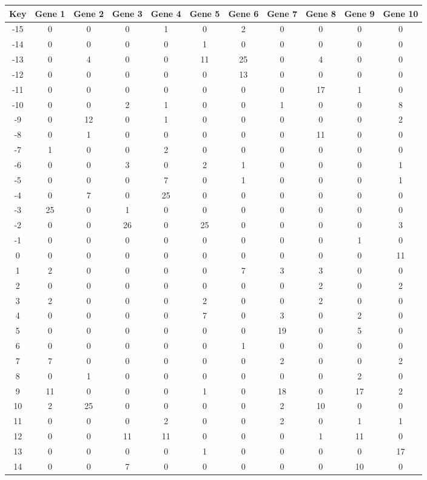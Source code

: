 \begin{tabular}{|c|c|c|c|c|c|c|c|c|c|c|}
\hline
Key & Gene 1 & Gene 2 & Gene 3 & Gene 4 & Gene 5 & Gene 6 & Gene 7 & Gene 8 & Gene 9 & Gene 10 \\
\hline
-15 & 0 & 0 & 0 & 1 & 0 & 2 & 0 & 0 & 0 & 0 \\
-14 & 0 & 0 & 0 & 0 & 1 & 0 & 0 & 0 & 0 & 0 \\
-13 & 0 & 4 & 0 & 0 & 11 & 25 & 0 & 4 & 0 & 0 \\
-12 & 0 & 0 & 0 & 0 & 0 & 13 & 0 & 0 & 0 & 0 \\
-11 & 0 & 0 & 0 & 0 & 0 & 0 & 0 & 17 & 1 & 0 \\
-10 & 0 & 0 & 2 & 1 & 0 & 0 & 1 & 0 & 0 & 8 \\
-9 & 0 & 12 & 0 & 1 & 0 & 0 & 0 & 0 & 0 & 2 \\
-8 & 0 & 1 & 0 & 0 & 0 & 0 & 0 & 11 & 0 & 0 \\
-7 & 1 & 0 & 0 & 2 & 0 & 0 & 0 & 0 & 0 & 0 \\
-6 & 0 & 0 & 3 & 0 & 2 & 1 & 0 & 0 & 0 & 1 \\
-5 & 0 & 0 & 0 & 7 & 0 & 1 & 0 & 0 & 0 & 1 \\
-4 & 0 & 7 & 0 & 25 & 0 & 0 & 0 & 0 & 0 & 0 \\
-3 & 25 & 0 & 1 & 0 & 0 & 0 & 0 & 0 & 0 & 0 \\
-2 & 0 & 0 & 26 & 0 & 25 & 0 & 0 & 0 & 0 & 3 \\
-1 & 0 & 0 & 0 & 0 & 0 & 0 & 0 & 0 & 1 & 0 \\
0 & 0 & 0 & 0 & 0 & 0 & 0 & 0 & 0 & 0 & 11 \\
1 & 2 & 0 & 0 & 0 & 0 & 7 & 3 & 3 & 0 & 0 \\
2 & 0 & 0 & 0 & 0 & 0 & 0 & 0 & 2 & 0 & 2 \\
3 & 2 & 0 & 0 & 0 & 2 & 0 & 0 & 2 & 0 & 0 \\
4 & 0 & 0 & 0 & 0 & 7 & 0 & 3 & 0 & 2 & 0 \\
5 & 0 & 0 & 0 & 0 & 0 & 0 & 19 & 0 & 5 & 0 \\
6 & 0 & 0 & 0 & 0 & 0 & 1 & 0 & 0 & 0 & 0 \\
7 & 7 & 0 & 0 & 0 & 0 & 0 & 2 & 0 & 0 & 2 \\
8 & 0 & 1 & 0 & 0 & 0 & 0 & 0 & 0 & 2 & 0 \\
9 & 11 & 0 & 0 & 0 & 1 & 0 & 18 & 0 & 17 & 2 \\
10 & 2 & 25 & 0 & 0 & 0 & 0 & 2 & 10 & 0 & 0 \\
11 & 0 & 0 & 0 & 2 & 0 & 0 & 2 & 0 & 1 & 1 \\
12 & 0 & 0 & 11 & 11 & 0 & 0 & 0 & 1 & 11 & 0 \\
13 & 0 & 0 & 0 & 0 & 1 & 0 & 0 & 0 & 0 & 17 \\
14 & 0 & 0 & 7 & 0 & 0 & 0 & 0 & 0 & 10 & 0 \\
\hline
\end{tabular}